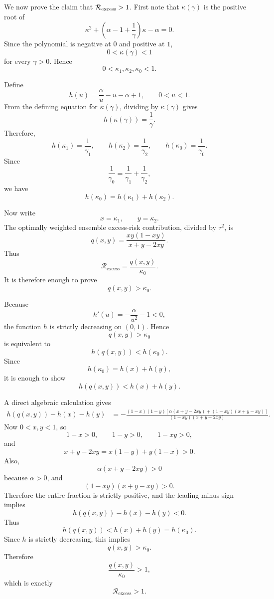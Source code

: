 \documentclass{article}
\theoremstyle{plain}
\theoremstyle{remark}
\begin{document}
We now prove the claim that $\mathcal{R}_{\rm excess}>1$. First note that $\kappa(\gamma)$ is the positive root of
\[
    \kappa^2+
    \left(
        \alpha-1+\frac{1}{\gamma}
    \right)\kappa
    -
    \alpha
    =
    0.
\]
Since the polynomial is negative at $0$ and positive at $1$,
\[
    0<\kappa(\gamma)<1
\]
for every $\gamma>0$. Hence
\[
    0<\kappa_1,\kappa_2,\kappa_0<1.
\]

Define
\[
    h(u)
    =
    \frac{\alpha}{u}-u-\alpha+1,
    \qquad
    0<u<1.
\]
From the defining equation for $\kappa(\gamma)$, dividing by
$\kappa(\gamma)$ gives
\[
    h(\kappa(\gamma))
    =
    \frac{1}{\gamma}.
\]
Therefore,
\[
    h(\kappa_1)=\frac{1}{\gamma_1},
    \qquad
    h(\kappa_2)=\frac{1}{\gamma_2},
    \qquad
    h(\kappa_0)=\frac{1}{\gamma_0}.
\]
Since
\[
    \frac{1}{\gamma_0}
    =
    \frac{1}{\gamma_1}
    +
    \frac{1}{\gamma_2},
\]
we have
\[
    h(\kappa_0)
    =
    h(\kappa_1)+h(\kappa_2).
\]

Now write
\[
    x=\kappa_1,
    \qquad
    y=\kappa_2.
\]
The optimally weighted ensemble excess-risk contribution, divided by
$\tau^2$, is
\[
    q(x,y)
    =
    \frac{
    xy(1-xy)
    }{
    x+y-2xy
    }.
\]
Thus
\[
    \mathcal R_{\mathrm{excess}}
    =
    \frac{q(x,y)}{\kappa_0}.
\]
It is therefore enough to prove
\[
    q(x,y)>\kappa_0.
\]

Because
\[
    h'(u)
    =
    -\frac{\alpha}{u^2}-1<0,
\]
the function $h$ is strictly decreasing on $(0,1)$. Hence
\[
    q(x,y)>\kappa_0
\]
is equivalent to
\[
    h(q(x,y))<h(\kappa_0).
\]
Since
\[
    h(\kappa_0)=h(x)+h(y),
\]
it is enough to show
\[
    h(q(x,y))<h(x)+h(y).
\]

A direct algebraic calculation gives
\[
\begin{aligned}
    h(q(x,y))-h(x)-h(y)
    &=
    -
    \frac{
    (1-x)(1-y)
    \left[
        \alpha(x+y-2xy)
        +(1-xy)(x+y-xy)
    \right]
    }{
    (1-xy)(x+y-2xy)
    }.
\end{aligned}
\]
Now \(0<x,y<1\), so
\[
    1-x>0,
    \qquad
    1-y>0,
    \qquad
    1-xy>0,
\]
and
\[
    x+y-2xy
    =
    x(1-y)+y(1-x)>0.
\]
Also,
\[
    \alpha(x+y-2xy)>0
\]
because \(\alpha>0\), and
\[
    (1-xy)(x+y-xy)>0.
\]
Therefore the entire fraction is strictly positive, and the leading
minus sign implies
\[
    h(q(x,y))-h(x)-h(y)<0.
\]
Thus
\[
    h(q(x,y))<h(x)+h(y)=h(\kappa_0).
\]
Since \(h\) is strictly decreasing, this implies
\[
    q(x,y)>\kappa_0.
\]
Therefore
\[
    \frac{q(x,y)}{\kappa_0}>1,
\]
which is exactly
\[
    \mathcal R_{\mathrm{excess}}>1.
\]






\newpage

\newpage

\end{document}
